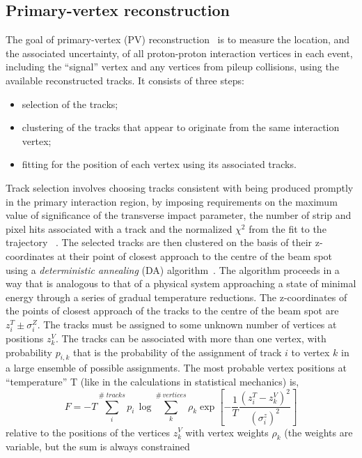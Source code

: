\subsection*{Primary-vertex reconstruction}
The goal of primary-vertex (PV) reconstruction~\cite{Speer:927395}  is to measure the location, and the associated
uncertainty, of all proton-proton interaction vertices in each event, including the ``signal'' vertex
and any vertices from pileup collisions, using the available reconstructed tracks.  
It consists of three steps: 
\begin{itemize} 
\item  selection of the tracks;
\item clustering of the tracks that appear to originate from the same interaction vertex;
\item fitting for the position of each vertex using its associated tracks.
\end{itemize}
Track selection involves choosing tracks consistent with being produced promptly in the primary interaction region, by imposing requirements on the maximum value of significance of the transverse impact parameter,  the number of strip and pixel hits associated with a track and the normalized
$\chi^2$ from the fit to the trajectory  ~\cite{Chatrchyan:2014fea}.
The selected tracks are then clustered on the basis of their z-coordinates at their point of closest approach to the centre of the beam spot  using a
\textit{deterministic annealing} (DA) algorithm~\cite{726788}. 
The algorithm proceeds in a way that is analogous to that of a physical system approaching a state of minimal energy through a series of
gradual  temperature  reductions. 
The z-coordinates  of  the  points  of  closest  approach  of  the tracks to the centre of the beam spot are $z_i^T \pm \sigma_i^Z$.
 The tracks must be assigned to some unknown number of vertices at positions $z_k^V$.
The tracks can be associated with more than one vertex, with probability $p_{i,k}$ that is  the probability of the
assignment of track $i$ to vertex $k$ in a large ensemble of possible assignments.
 The most probable vertex positions at ``temperature'' T (like in the calculations in statistical mechanics) is,
\begin{equation}
F=-T \sum_{i}^{\# \; tracks} p_i \, \log \sum_{k}^{\# \, vertices} \rho_k  \exp [-\frac{1}{T} \frac{(z_i^T-z_k^V)^2}{(\sigma_i^z)^2}  ]
\end{equation}
 relative to the positions of the vertices $z_k^V$ with vertex weights $\rho_k$ (the weights are variable, but the sum is always constrained
